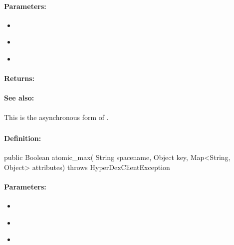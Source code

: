 \paragraph{Parameters:}
\begin{itemize}[noitemsep]
\item {}\\

\item {}\\

\item {}\\

\end{itemize}

\paragraph{Returns:}


\paragraph{See also:}  This is the asynchronous form of .

\pagebreak
\subsubsection{}
\label{api:java:atomic_max}


\paragraph{Definition:}
\begin{javacode}
public Boolean atomic_max(
        String spacename,
        Object key,
        Map<String, Object> attributes) throws HyperDexClientException
\end{javacode}

\paragraph{Parameters:}
\begin{itemize}[noitemsep]
\item {}\\

\item {}\\

\item {}\\

\end{itemize}

